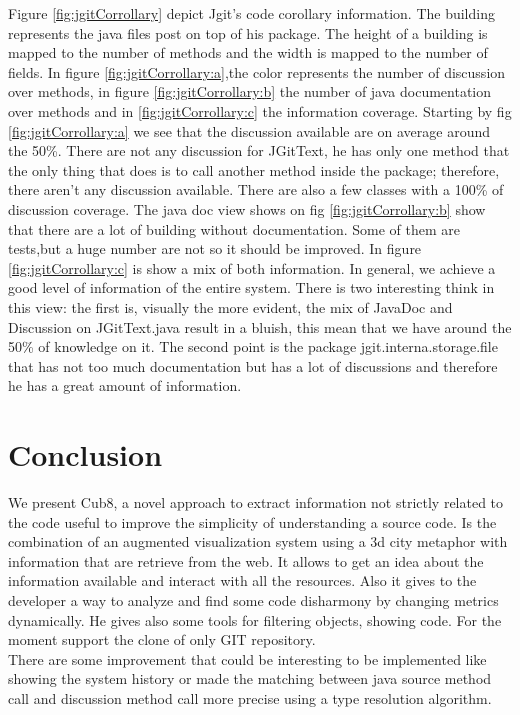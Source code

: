 \documentclass[]{usiinfbachelorproject}
\begin{document}
Figure \ref{fig:jgitCorrollary} depict Jgit's code corollary information. The building represents the java files post on top of his package. The height of a building is mapped to the number of methods and the width is mapped to the number of fields. In  figure \ref{fig:jgitCorrollary:a},the color represents  the number of discussion over methods, in figure \ref{fig:jgitCorrollary:b} the number of java documentation over methods and in  \ref{fig:jgitCorrollary:c} the information coverage.
Starting by fig  \ref{fig:jgitCorrollary:a} we see that the discussion available are on average around the 50\%. There are not any discussion for JGitText, he has only one method that the only thing that does is to call another method inside the package; therefore, there aren't any discussion available.  There are also a few classes with a 100\% of discussion coverage.
The java doc view shows on fig  \ref{fig:jgitCorrollary:b} show that there are a lot of building without documentation. Some of them are tests,but a huge number are not so it should be improved.
In figure  \ref{fig:jgitCorrollary:c} is show a mix of both information. In general, we achieve a good level of information of the entire system. There is two interesting think in this view:  the first is, visually the more evident, the mix of JavaDoc and Discussion on JGitText.java result in a bluish, this mean that we have around the 50\% of knowledge on it.  The second point is  the package jgit.interna.storage.file that has not too much documentation but has a lot  of discussions and therefore he has a great amount of information.

















\newpage
\section{Conclusion} \label{conclusion}
We present Cub8, a novel approach to extract information not strictly related to the code useful to improve the simplicity of understanding a source code. Is the combination of an augmented visualization system using a 3d city metaphor with information that are retrieve from the web. It allows to get  an idea about the information available and interact with all the resources. Also it gives to the developer a way to analyze and find some code disharmony by changing metrics dynamically. He gives also some tools for filtering objects, showing code. For the moment support the clone of only GIT repository. \\
There are some improvement that could be interesting to be implemented like showing the system history or made the matching between java source method call and discussion method call more precise using a type resolution algorithm.\\
  
  

\newpage



\end{document}
